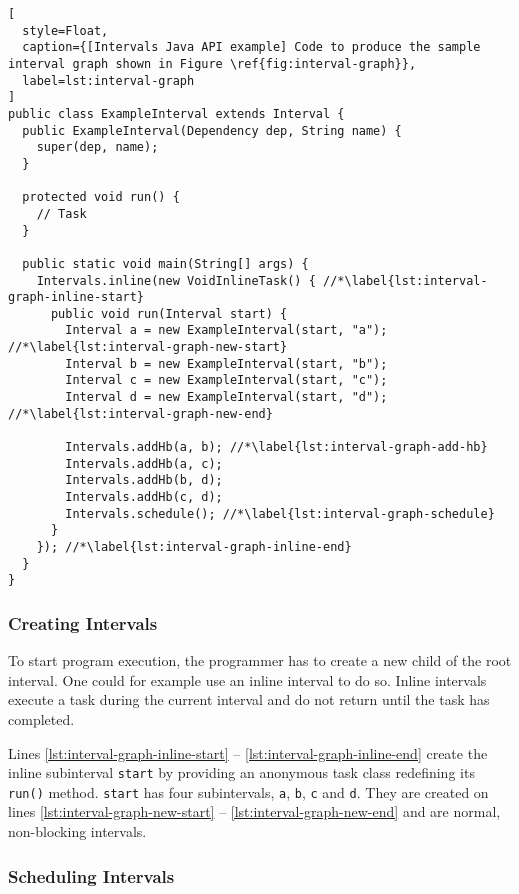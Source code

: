 \begin{lstlisting}[
  style=Float, 
  caption={[Intervals Java API example] Code to produce the sample interval graph shown in Figure \ref{fig:interval-graph}},
  label=lst:interval-graph
]
public class ExampleInterval extends Interval {
  public ExampleInterval(Dependency dep, String name) {
    super(dep, name);
  }
  
  protected void run() {
    // Task
  }
  
  public static void main(String[] args) {
    Intervals.inline(new VoidInlineTask() { //*\label{lst:interval-graph-inline-start}
      public void run(Interval start) {
        Interval a = new ExampleInterval(start, "a"); //*\label{lst:interval-graph-new-start}
        Interval b = new ExampleInterval(start, "b");
        Interval c = new ExampleInterval(start, "c");
        Interval d = new ExampleInterval(start, "d"); //*\label{lst:interval-graph-new-end}
        
        Intervals.addHb(a, b); //*\label{lst:interval-graph-add-hb}
        Intervals.addHb(a, c);
        Intervals.addHb(b, d);
        Intervals.addHb(c, d);
        Intervals.schedule(); //*\label{lst:interval-graph-schedule}
      }
    }); //*\label{lst:interval-graph-inline-end}
  }
}
\end{lstlisting}

\subsubsection{Creating Intervals}
\label{sec:intro-intervals-creating-intervals}

To start program execution, the programmer has to create a new child
of the root interval. One could for example use an inline interval to
do so. Inline intervals execute a task during the current interval and
do not return until the task has completed.

Lines \ref{lst:interval-graph-inline-start} --
\ref{lst:interval-graph-inline-end} create the inline subinterval
\lstinline|start| by providing an anonymous task class redefining its
\lstinline|run()| method. \lstinline|start| has four subintervals,
\lstinline|a|, \lstinline|b|, \lstinline|c| and \lstinline|d|. They
are created on lines \ref{lst:interval-graph-new-start} --
\ref{lst:interval-graph-new-end} and are normal, non-blocking
intervals.

\subsubsection{Scheduling Intervals}
\label{sec:intro-intervals-scheduling-intervals}

